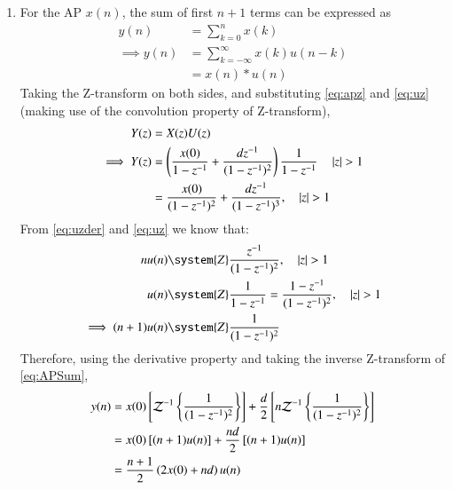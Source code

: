 \documentclass[journal,12pt,onecolumn]{IEEEtran}
\theoremstyle{remark}
\begin{document}
\begin{enumerate}[label=\thechapter.\arabic*,ref=\thechapter.\theenumi]
\item For the AP $x(n)$, the sum of first $n+1$ terms can be expressed as
\begin{align}
y(n) &= \sum_{k=0}^{n} x(k)\\
\implies y(n) &= \sum_{k=-\infty}^{\infty} x(k) u(n-k)\\
&= x(n) * u(n)
\end{align}
Taking the Z-transform on both sides, and substituting \eqref{eq:apz} and \eqref{eq:uz} (making use of the convolution property of Z-transform),
\begin{align}
Y(z) &= X(z) U(z)\\
\implies Y(z) &= \left(\frac{x(0)}{1-z^{-1}} + \frac{dz^{-1}}{(1-z^{-1})^{2}}\right)\frac{1}{1-z^{-1}} \quad \left\vert z\right\vert > 1 \\
&= \frac{x(0)}{({1-z^{-1}})^2} + \frac{dz^{-1}}{(1-z^{-1})^{3}}, \quad \left\vert z\right\vert > 1 \label{eq:APSum}
\end{align}
From \eqref{eq:uzder} and \eqref{eq:uz} we know that:
\begin{align}
nu(n) &\system{Z}\frac{z^{-1}}{(1-z^{-1})^{2}}, \quad \abs{z} > 1 \\
u(n) &\system{Z}\frac{1}{1-z^{-1}} = \frac{1-z^{-1}}{(1-z^{-1})^2}, \quad \abs{z} > 1 \\
\implies (n+1) u(n) &\system{Z} \frac{1}{({1-z^{-1}})^2}
\end{align}
Therefore, using the derivative property and taking the inverse Z-transform of \eqref{eq:APSum},
\begin{align}
y(n) &= x(0){}\left[\mathcal{Z}^{-1}\left\{\frac{1}{(1-z^{-1})^{2}}\right\}\right] + \frac{d}{2}{}\left[n \mathcal{Z}^{-1}\left\{\frac{1}{(1-z^{-1})^{2}}\right\}\right]\\
&= x(0){}\left[(n + 1)u(n)\right] + \frac{nd}{2}{}\left[(n + 1)u(n)\right]\\
&= \frac{n+1}{2}\left(2x(0) + nd\right)u(n)
\end{align}
\end{enumerate}
\end{document}

